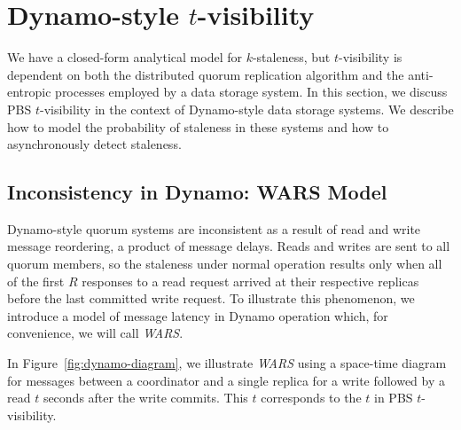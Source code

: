 \documentclass{vldb}
\newcommand{\sectionskip}{-0em}
\newcommand{\subsectionskip}{-0em}
\begin{document}
\vspace{\sectionskip}\section{Dynamo-style $t$-visibility}
\label{sec:dynamo}

We have a closed-form analytical model for $k$-staleness, but
$t$-visibility is dependent on both the distributed quorum replication
algorithm and the anti-entropic processes employed by a data storage
system.  In this section, we discuss PBS $t$-visibility in the context
of Dynamo-style data storage systems.  We describe how to model the
probability of staleness in these systems and how to asynchronously
detect staleness.

\vspace{\subsectionskip}\subsection{Inconsistency in Dynamo: WARS Model}
\label{sec:wars}

Dynamo-style quorum systems are inconsistent as a result of read and
write message reordering, a product of message delays.  Reads and
writes are sent to all quorum members, so the staleness under normal
operation results only when all of the first $R$ responses to a read
request arrived at their respective replicas before the last committed
write request.  To illustrate this phenomenon, we introduce a model
of message latency in Dynamo operation which, for convenience, we will
call \textit{WARS}.

In Figure~\ref{fig:dynamo-diagram}, we illustrate \textit{WARS} using
a space-time diagram for messages between a coordinator and a single
replica for a write followed by a read $t$ seconds after the write
commits.  This $t$ corresponds to the $t$ in PBS $t$-visibility.
\end{document}
